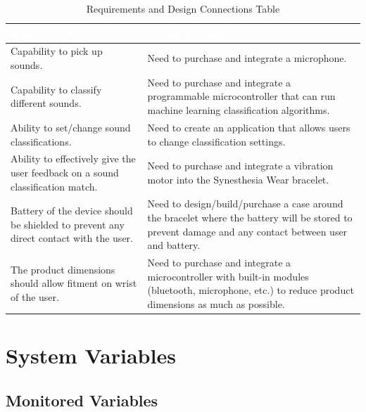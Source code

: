 \documentclass[12pt, titlepage]{article}
\begin{document}
\begin{table}[H]
  \centering
  \caption{Requirements and Design Connections Table}
  \label{table:Connections Table} 
  \begin{tabular}{|p{7cm}|p{7cm}|} 
  \hline
  \rowcolor[rgb]{0.071,0.49,0.698} \textcolor{white}{Requirements} & \textcolor{white}{Design Decision}                                          \\ 
  \hline
  \rowcolor[rgb]{0.675,0.827,0.902} Capability to pick up sounds.              & Need to purchase and integrate a microphone.\\
  \hline
  \rowcolor[rgb]{0.675,0.827,0.902} Capability to classify different sounds.              & Need to purchase and integrate a programmable microcontroller that can run machine learning classification algorithms.\\
  \hline
  \rowcolor[rgb]{0.675,0.827,0.902} Ability to set/change sound classifications.            & Need to create an application that allows users to change classification settings.\\    
  \hline
  \rowcolor[rgb]{0.675,0.827,0.902} Ability to effectively give the user feedback on a sound classification match.           & Need to purchase and integrate a vibration motor into the Synesthesia Wear bracelet.\\
  \hline
  \rowcolor[rgb]{0.675,0.827,0.902} Battery of the device should be shielded to prevent any direct contact with the user.           & Need to design/build/purchase a case around the bracelet where the battery will be stored to prevent damage and any contact between user and battery.\\
  \hline
  \rowcolor[rgb]{0.675,0.827,0.902} The product dimensions should allow fitment on wrist of the user.           & Need to purchase and integrate a microcontroller with built-in modules (bluetooth, microphone, etc.) to reduce product dimensions as much as possible.\\
  \hline
  \end{tabular}
\end{table}

\section{System Variables}


\subsection{Monitored Variables}
\end{document}

